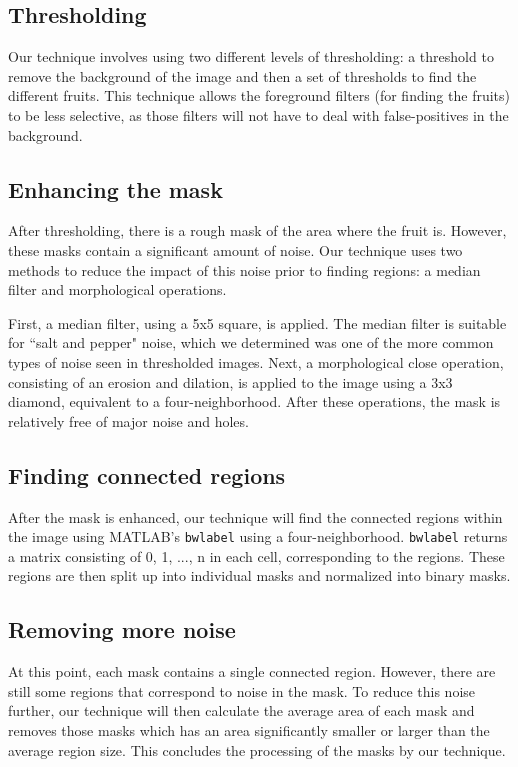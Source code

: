 \documentclass{article}
\begin{document}
\subsection{Thresholding}
Our technique involves using two different levels of thresholding: a threshold to remove the background of the image and then a set of thresholds to find the different fruits. This technique allows the foreground filters (for finding the fruits) to be less selective, as those filters will not have to deal with false-positives in the background.

\subsection{Enhancing the mask}
After thresholding, there is a rough mask of the area where the fruit is. However, these masks contain a significant amount of noise. Our technique uses two methods to reduce the impact of this noise prior to finding regions: a median filter and morphological operations. 

First, a median filter, using a 5x5 square, is applied. The median filter is suitable for ``salt and pepper" noise, which we determined was one of the more common types of noise seen in thresholded images. Next, a morphological close operation, consisting of an erosion and dilation, is applied to the image using a 3x3 diamond, equivalent to a four-neighborhood. After these operations, the mask is relatively free of major noise and holes.

\subsection{Finding connected regions}
After the mask is enhanced, our technique will find the connected regions within the image using MATLAB's \texttt{bwlabel} using a four-neighborhood. \texttt{bwlabel} returns a matrix consisting of 0, 1, ..., n in each cell, corresponding to the regions. These regions are then split up into individual masks and normalized into binary masks. 

\subsection{Removing more noise}
At this point, each mask contains a single connected region. However, there are still some regions that correspond to noise in the mask. To reduce this noise further, our technique will then calculate the average area of each mask and removes those masks which has an area significantly smaller or larger than the average region size. This concludes the processing of the masks by our technique. 
\end{document}
